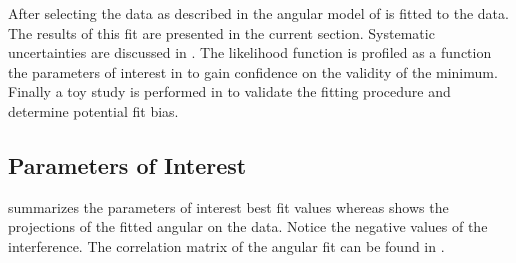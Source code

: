 After selecting the data as described in  the angular model of  is fitted to the data.
The results of this fit are presented in the current section. Systematic uncertainties are discussed in .
The likelihood function is profiled as a function  the parameters of interest in  to gain confidence on the validity
of the minimum. Finally a toy study is performed in  to validate the fitting procedure
and determine potential fit bias.

\subsection{Parameters of Interest}
\label{Parameters_of_Interest}

 summarizes the parameters of interest best fit values whereas
 shows the projections of the fitted angular \pdf on the data.
Notice the negative values of the \spwave interference. The correlation matrix of the
angular fit can be found in .

